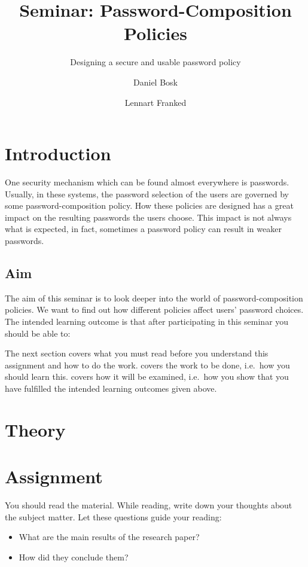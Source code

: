 \title{Seminar: Password-Composition Policies}
\subtitle{Designing a secure and usable password policy}

\author{%
  Daniel Bosk \and Lennart Franked
}

\maketitle

\section{Introduction}
\label{sec:intro}
One security mechanism which can be found almost everywhere is passwords.
Usually, in these systems, the password selection of the users are governed by 
some password-composition policy.
How these policies are designed has a great impact on the resulting passwords 
the users choose.
This impact is not always what is expected, in fact, sometimes a password 
policy can result in weaker passwords.

\subsection{Aim}
\label{sec:Syfte}
The aim of this seminar is to look deeper into the world of 
password-composition policies.
We want to find out how different policies affect users' password choices.
The intended learning outcome is that after participating in this seminar you 
should be able to:
\begin{itemize}
	
\end{itemize}

The next section covers what you must read before you understand this 
assignment and how to do the work.
 covers the work to be done, i.e.~how you should learn this.
 covers how it will be examined, i.e.~how you show that you have 
fulfilled the intended learning outcomes given above.

\section{Theory}
\label{sec:theory}


\section{Assignment}
\label{sec:tasks}
You should read the material.
While reading, write down your thoughts about the subject matter.
Let these questions guide your reading:
\begin{itemize}
  \item What are the main results of the research paper?
  \item How did they conclude them?
\end{itemize}

